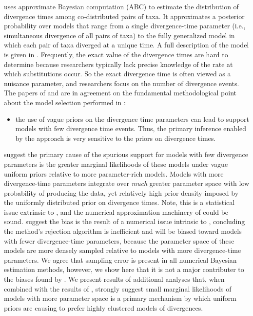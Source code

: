 \documentclass[letterpaper,12pt]{article}
\begin{document}
\begin{linenumbers}
{}

\newpage
\msb
\citep{Huang2011} uses approximate Bayesian computation (ABC) to
estimate the distribution of divergence times among co-distributed pairs of
taxa.
It approximates a posterior probability over models that range from a single
divergence-time parameter (i.e., simultaneous divergence of all pairs of taxa)
to the fully generalized model in which each pair of taxa diverged at a
unique time.
A full description of the model is given in \citet{Oaks2012}.
Frequently, the exact value of the divergence times are hard 
to determine because researchers typically lack precise knowledge 
of the rate at which substitutions occur.
So the exact divergence time is often viewed as a nuisance parameter, and
researchers focus on the number of divergence events.
The papers of \citet{Oaks2012} and \citet{Hickerson2013} are in agreement
on the fundamental methodological point about the model selection performed in \msb:
\begin{itemize}
   \item the use of vague priors on the divergence time parameters can 
    lead to support models with few divergence time events. Thus, the 
    primary inference enabled by the approach is very sensitive to the
    priors on divergence times.
\end{itemize}

\citet{Oaks2012} suggest the primary cause of the spurious support for models
with few divergence parameters is the greater marginal likelihoods of these
models under vague uniform priors relative to more parameter-rich models.
Models with more divergence-time parameters integrate over \emph{much} greater
parameter space with low probability of producing the data, yet relatively high
prior density \citep{Lindley1957} imposed by the uniformly distributed prior on
divergence times.
Note, this is a statistical issue extrinsic to \msb, and the numerical
approximation machinery of \msb could be sound.
\citet{Hickerson2013} suggest the bias is the result of a numerical issue
intrinsic to \msb, concluding the method's rejection algorithm is inefficient
and will be biased toward models with fewer divergence-time parameters, because
the parameter space of these models are more densely sampled relative to models
with more divergence-time parameters.
We agree that sampling error is present in all numerical Bayesian estimation
methods, however, we show here that it is not a major contributer to the
biases found by \citet{Oaks2012}.
We present results of additional analyses that, when combined with
the results of \citet{Oaks2012}, strongly suggest small marginal likelihoods of
models with more parameter space is a primary mechanism by which uniform priors
are causing \msb to prefer highly clustered models of divergences.


\end{linenumbers}
\end{document}

